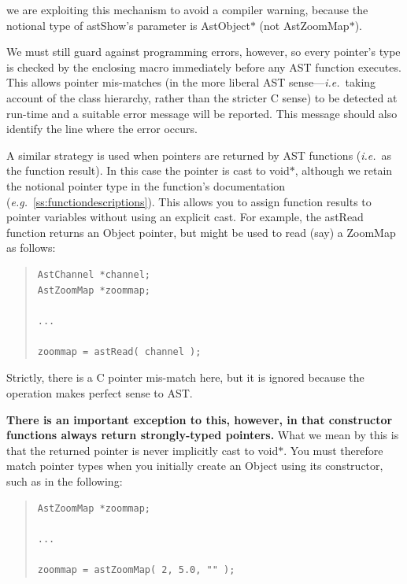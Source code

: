 \documentclass[twoside,11pt]{article}
\newcommand{\appref}[1]{Appendix~\ref{#1}}
\renewcommand{\appref}[1]{\ref{#1}}
\begin{document}
we are exploiting this mechanism to avoid a compiler warning, because
the notional type of astShow's parameter is AstObject$*$ (not
AstZoomMap$*$).

We must still guard against programming errors, however, so every
pointer's type is checked by the enclosing macro immediately before
any AST function executes. This allows pointer mis-matches (in the
more liberal AST sense---{\em{i.e.}}\ taking account of the class
hierarchy, rather than the stricter C sense) to be detected at
run-time and a suitable error message will be reported. This message
should also identify the line where the error occurs.

A similar strategy is used when pointers are returned by AST functions
({\em{i.e.}}\ as the function result). In this case the pointer is
cast to void$*$, although we retain the notional pointer type in the
function's documentation
({\em{e.g.}}\ \appref{ss:functiondescriptions}). This allows you to
assign function results to pointer variables without using an explicit
cast. For example, the astRead function returns an Object pointer, but
might be used to read (say) a ZoomMap as follows:

\begin{quote}
\small
\begin{verbatim}
AstChannel *channel;
AstZoomMap *zoommap;

...

zoommap = astRead( channel );
\end{verbatim}
\normalsize
\end{quote}

Strictly, there is a C pointer mis-match here, but it is ignored
because the operation makes perfect sense to AST.

{\bf{There is an important exception to this, however, in that
constructor functions always return strongly-typed pointers.}}  What
we mean by this is that the returned pointer is never implicitly cast
to void$*$. You must therefore match pointer types when you initially
create an Object using its constructor, such as in the following:

\begin{quote}
\small
\begin{verbatim}
AstZoomMap *zoommap;

...

zoommap = astZoomMap( 2, 5.0, "" );
\end{verbatim}
\normalsize
\end{quote}
\end{document}
